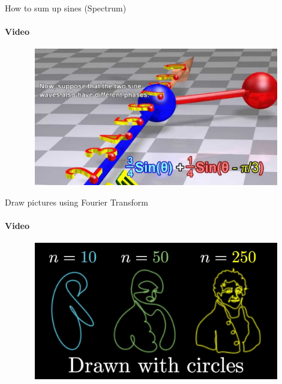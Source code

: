\documentclass[aspectratio=169]{beamer}
\begin{document}
\begin{frame}[t]{How to sum up sines (Spectrum)}
    \framesubtitle{Video}
    \vspace{-0.6cm}
    \begin{figure}[H]
        \href{https://youtu.be/r18Gi8lSkfM}{
            \centering\includegraphics[height=6cm,width=1\textwidth,keepaspectratio]{Intro_to_fourier.jpg}}
        \label{fig:Intro_to_fourier.jpg}
    \end{figure}
\end{frame}

\begin{frame}[t]{Draw pictures using Fourier Transform}
    \framesubtitle{Video}
    \vspace{-0.6cm}
    \begin{figure}[H]
        \href{https://youtu.be/r6sGWTCMz2k}{
            \centering\includegraphics[height=6cm,width=1\textwidth,keepaspectratio]{drawn_with_circles.jpg}}
        \label{fig:drawn_with_circles.jpg}
    \end{figure}
\end{frame}
\end{document}
